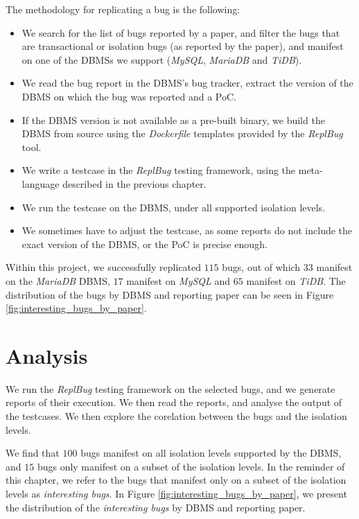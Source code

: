 The methodology for replicating a bug is the following:
\begin{itemize}
    \item We search for the list of bugs reported by a paper, and filter the bugs that are transactional or isolation bugs (as reported by the paper), and manifest on one of the DBMSs we support (\textit{MySQL}, \textit{MariaDB} and \textit{TiDB}).
    \item We read the bug report in the DBMS's bug tracker, extract the version of the DBMS on which the bug was reported and a PoC.
    \item If the DBMS version is not available as a pre-built binary, we build the DBMS from source using the \textit{Dockerfile} templates provided by the \textit{ReplBug} tool.
    \item We write a testcase in the \textit{ReplBug} testing framework, using the meta-language described in the previous chapter.
    \item We run the testcase on the DBMS, under all supported isolation levels.
    \item We sometimes have to adjust the testcase, as some reports do not include the exact version of the DBMS, or the PoC is precise enough. 
\end{itemize}

Within this project, we successfully replicated $115$ bugs, out of which $33$ manifest on the \textit{MariaDB} DBMS, $17$ manifest on \textit{MySQL} and $65$ manifest on \textit{TiDB}. The distribution of the bugs by DBMS and reporting paper can be seen in Figure \ref{fig:interesting_bugs_by_paper}.

\section{Analysis}

We run the \textit{ReplBug} testing framework on the selected bugs, and we generate reports of their execution. We then read the reports, and analyse the output of the testcases. We then explore the corelation between the bugs and the isolation levels.

We find that $100$ bugs manifest on all isolation levels supported by the DBMS, and $15$ bugs only manifest on a subset of the isolation levels. In the reminder of this chapter, we refer to the bugs that manifest only on a subset of the isolation levels as \textit{interesting bugs}. In Figure \ref{fig:interesting_bugs_by_paper}, we present the distribution of the \textit{interesting bugs} by DBMS and reporting paper.

